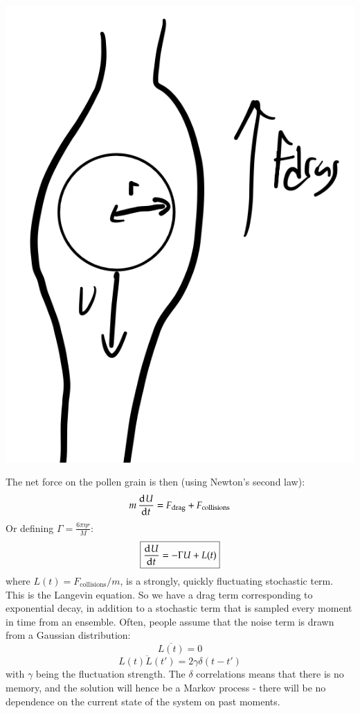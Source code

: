 \begin{center}
    \includegraphics[scale=0.4]{Lectures/Images/lec17-stokesdrag.png}
\end{center}

The net force on the pollen grain is then (using Newton's second law):
\begin{equation}
    m\dod{U}{t} = F_{\text{drag}} + F_{\text{collisions}}
\end{equation}
Or defining $\Gamma = \frac{6\pi \eta r}{M}$:
\begin{equation}
    \boxed{\dod{U}{t} = -\Gamma U + L(t)}
\end{equation}
where $L(t) = F_{\text{collisions}}/m$, is a strongly, quickly fluctuating stochastic term. This is the Langevin equation. So we have a drag term corresponding to exponential decay, in addition to a stochastic term that is sampled every moment in time from an ensemble. Often, people assume that the noise term is drawn from a Gaussian distribution:
\begin{equation}
    \overline{L(t)} = 0
\end{equation}
\begin{equation}
    \overline{L(t)L(t')} = 2\gamma\delta(t-t')
\end{equation}
with $\gamma$ being the fluctuation strength. The $\delta$ correlations means that there is no memory, and the solution will hence be a Markov process - there will be no dependence on the current state of the system on past moments.

